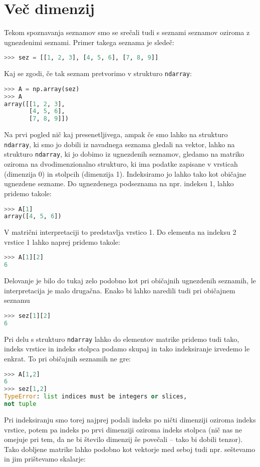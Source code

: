 \section{Več dimenzij}

Tekom spoznavanja seznamov smo se srečali tudi s seznami seznamov oziroma z ugnezdenimi seznami. Primer takega seznama je sledeč:
\begin{lstlisting}[language=Python]
>>> sez = [[1, 2, 3], [4, 5, 6], [7, 8, 9]]
\end{lstlisting}
Kaj se zgodi, če tak seznam pretvorimo v strukturo \texttt{ndarray}:
\begin{lstlisting}[language=Python]
>>> A = np.array(sez)
>>> A
array([[1, 2, 3],
       [4, 5, 6],
       [7, 8, 9]])
\end{lstlisting}
Na prvi pogled nič kaj presenetljivega, ampak če smo lahko na strukturo \texttt{ndarray}, ki smo jo dobili iz navadnega seznama gledali na vektor, lahko na strukturo \texttt{ndarray}, ki jo dobimo iz ugnezdenih seznamov, gledamo na matriko oziroma na dvodimenzionalno strukturo, ki ima podatke zapisane v vrsticah (dimenzija 0) in stolpcih (dimenzija 1). Indeksiramo jo lahko tako kot običajne ugnezdene sezname. Do ugnezdenega podseznama na npr. indeksu 1, lahko pridemo takole:
\begin{lstlisting}[language=Python]
>>> A[1]
array([4, 5, 6])
\end{lstlisting}
V matrični interpretaciji to predstavlja vrstico 1. Do elementa na indeksu 2 vrstice 1 lahko naprej pridemo takole:
\begin{lstlisting}[language=Python]
>>> A[1][2]
6
\end{lstlisting}
Delovanje je bilo do tukaj zelo podobno kot pri običajnih ugnezdenih seznamih, le interpretacija je malo drugačna. Enako bi lahko naredili tudi pri običajnem seznamu
\begin{lstlisting}[language=Python]
>>> sez[1][2]
6
\end{lstlisting}
Pri delu s strukturo \texttt{ndarray} lahko do elementov matrike pridemo tudi tako, indeks vrstice in indeks stolpca podamo skupaj in tako indeksiranje izvedemo le enkrat. To pri običajnih seznamih ne gre:
\begin{lstlisting}[language=Python]
>>> A[1,2]
6
>>> sez[1,2]
TypeError: list indices must be integers or slices, 
not tuple
\end{lstlisting}
Pri indeksiranju smo torej najprej podali indeks po ničti dimenziji oziroma indeks vrstice, potem pa indeks po prvi dimenziji oziroma indeks stolpca (nič nas ne omejuje pri tem, da ne bi število dimenzij še povečali -- tako bi dobili tenzor). Tako dobljene matrike lahko podobno kot vektorje med seboj tudi npr. seštevamo in jim prištevamo skalarje:
